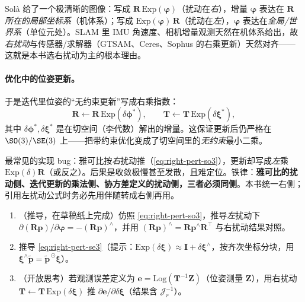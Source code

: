 \begin{insight}[为什么右扰动 = 在“机体/局部系”下扰动]
Solà\cite{sola2018micro} 给了一个极清晰的图像：写成 $\mathbf{R}\,\mathrm{Exp}(\boldsymbol{\varphi})$（扰动在\emph{右}），增量 $\boldsymbol{\varphi}$ 表达在 $\mathbf{R}$ \emph{所在的局部坐标系}（机体系）；写成 $\mathrm{Exp}(\boldsymbol{\varphi})\,\mathbf{R}$（扰动在\emph{左}），$\boldsymbol{\varphi}$ 表达在\emph{全局/世界系}（单位元处）。SLAM 里 IMU 角速度、相机增量观测天然在机体系给出，故\emph{右扰动}与传感器/求解器（GTSAM、Ceres、Sophus 的右乘更新）天然对齐——这就是本书选右扰动为主的根本理由。
\end{insight}

\paragraph{优化中的位姿更新。}于是迭代里位姿的“无约束更新”写成右乘指数：
\begin{equation}
  \mathbf{R}\leftarrow\mathbf{R}\,\mathrm{Exp}(\delta\boldsymbol{\phi}^*),\qquad
  \mathbf{T}\leftarrow\mathbf{T}\,\mathrm{Exp}(\delta\boldsymbol{\xi}^*),
  \label{eq:right-update}
\end{equation}
其中 $\delta\boldsymbol{\phi}^*,\delta\boldsymbol{\xi}^*$ 是在切空间（李代数）解出的增量。这保证更新后仍严格在 $\SO(3)/\SE(3)$ 上——把带约束优化变成了切空间里的\emph{无约束}最小二乘。

\begin{pitfall}
最常见的实现 bug：雅可比按\emph{右}扰动推（\cref{eq:right-pert-so3}），更新却写成\emph{左}乘 $\mathrm{Exp}(\delta)\mathbf{R}$（或反之）。后果是收敛极慢甚至发散，且难定位。铁律：\textbf{雅可比的扰动侧、迭代更新的乘法侧、协方差定义的扰动侧，三者必须同侧}。本书统一右侧；引用左扰动公式时务必先用伴随转成右侧再用。
\end{pitfall}

\begin{practice}
\begin{enumerate}
  \item （推导，在草稿纸上完成）仿照 \cref{eq:right-pert-so3}，推导\emph{左}扰动下 $\partial(\mathbf{R}\mathbf{p})/\partial\boldsymbol{\varphi}=-(\mathbf{R}\mathbf{p})^\wedge$，并用 $(\mathbf{R}\mathbf{p})^\wedge=\mathbf{R}\mathbf{p}^\wedge\mathbf{R}^\top$ 与右扰动结果对照。
  \item 推导 \cref{eq:right-pert-se3}（提示：$\mathrm{Exp}(\delta\boldsymbol{\xi})\approx\mathbf{I}+\delta\boldsymbol{\xi}^\wedge$，按齐次坐标分块，用 $\boldsymbol{\xi}^\wedge\tilde{\mathbf{p}}=\tilde{\mathbf{p}}^{\,\odot}\boldsymbol{\xi}$）。
  \item （开放思考）若观测误差定义为 $\mathbf{e}=\mathrm{Log}(\mathbf{T}^{-1}\mathbf{Z})$（位姿测量 $\mathbf{Z}$），用右扰动 $\mathbf{T}\leftarrow\mathbf{T}\,\mathrm{Exp}(\delta\boldsymbol{\xi})$ 推 $\partial\mathbf{e}/\partial\delta\boldsymbol{\xi}$（结果含 $\boldsymbol{\mathcal{J}}_r^{-1}$）。
\end{enumerate}
\end{practice}

